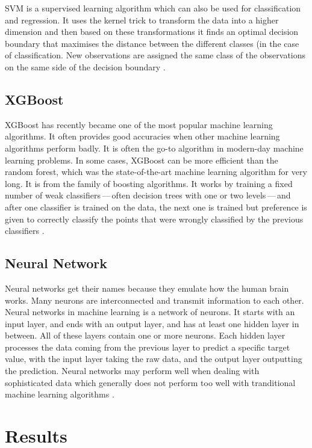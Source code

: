 \documentclass{article}
\begin{document}
\ac{SVM} is a supervised learning algorithm which can also be used for classification and regression.
It uses the kernel trick to transform the data into a higher dimension and then based on these transformations it finds an optimal decision boundary that maximises the distance between the different classes (in the case of classification.
New observations are assigned the same class of the observations on the same side of the decision boundary \citep{yadav_2018}.

\subsection{XGBoost}

XGBoost has recently became one of the most popular machine learning algorithms. 
It often provides good accuracies when other machine learning algorithms perform badly. 
It is often the go-to algorithm in modern-day machine learning problems. 
In some cases, XGBoost can be more efficient than the random forest, which was the state-of-the-art machine learning algorithm for very long. 
It is from the family of boosting algorithms. 
It works by training a fixed number of weak classifiers\,---\,often decision trees with one or two levels\,---\,and after one classifier is trained on the data, the next one is trained but preference is given to correctly classify the points that were wrongly classified by the previous classifiers \citep{seif_2022}.

\subsection{Neural Network}
Neural networks get their names because they emulate how the human brain works.
Many neurons are interconnected and transmit information to each other. 
Neural networks in machine learning is a network of neurons.
It starts with an input layer, and ends with an output layer, and has at least one hidden layer in between. 
All of these layers contain one or more neurons.
Each hidden layer processes the data coming from the previous layer to predict a specific target value, with the input layer taking the raw data, and the output layer outputting the prediction.
Neural networks may perform well when dealing with sophisticated data which generally does not perform too well with tranditional machine learning algorithms \citep{neuronetwork_2019}.

\section{Results}
\end{document}
